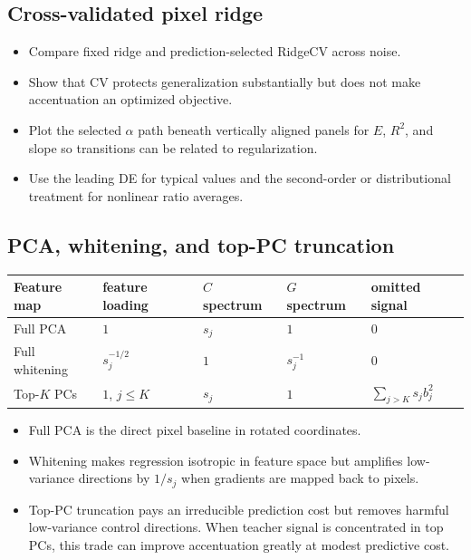 \documentclass[11pt]{article}
\begin{document}
\subsection{Cross-validated pixel ridge}

\begin{itemize}
  \item Compare fixed ridge and prediction-selected RidgeCV across noise.
  \item Show that CV protects generalization substantially but does not make
        accentuation an optimized objective.
  \item Plot the selected $\alpha$ path beneath vertically aligned panels for
        $E$, $R^2$, and slope so transitions can be related to regularization.
  \item Use the leading DE for typical values and the second-order or
        distributional treatment for nonlinear ratio averages.
\end{itemize}

\subsection{PCA, whitening, and top-PC truncation}

\begin{center}
\begin{tabular}{@{}lllll@{}}
\toprule
Feature map & feature loading & $C$ spectrum & $G$ spectrum & omitted signal\\
\midrule
Full PCA & $1$ & $s_j$ & $1$ & $0$\\
Full whitening & $s_j^{-1/2}$ & $1$ & $s_j^{-1}$ & $0$\\
Top-$K$ PCs & $1$, $j\le K$ & $s_j$ & $1$ & $\sum_{j>K}s_jb_j^2$\\
\bottomrule
\end{tabular}
\end{center}

\begin{itemize}
  \item Full PCA is the direct pixel baseline in rotated coordinates.
  \item Whitening makes regression isotropic in feature space but amplifies
        low-variance directions by $1/s_j$ when gradients are mapped back to
        pixels.
  \item Top-PC truncation pays an irreducible prediction cost but removes
        harmful low-variance control directions. When teacher signal is
        concentrated in top PCs, this trade can improve accentuation greatly
        at modest predictive cost.
\end{itemize}
\end{document}
